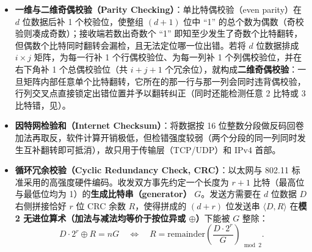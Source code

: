 \begin{itemize}
\item \textbf{一维与二维奇偶校验（Parity Checking）}：单比特偶校验（even parity）在 $d$ 位数据后补 1 个校验位，使整组 $(d+1)$ 位中 ``1'' 的总个数为偶数（奇校验则凑成奇数）；接收端若数出奇数个 ``1'' 即知至少发生了奇数个比特翻转，但偶数个比特同时翻转会漏检，且无法定位哪一位出错。若将 $d$ 位数据排成 $i \times j$ 矩阵，为每一行补 1 个行偶校验位、为每一列补 1 个列偶校验位，并在右下角补 1 个总偶校验位（共 $i+j+1$ 个冗余位），就构成\textbf{二维奇偶校验}：一旦矩阵内部任意单个比特翻转，它所在的那一行与那一列会同时违背偶校验，行列交叉点直接锁定出错位置并予以翻转纠正（同时还能检测任意 2 比特或 3 比特错，见）。
\item \textbf{因特网检验和（Internet Checksum）}：将数据按 16 位整数分段做反码回卷加法再取反，软件计算开销极低，但检错强度较弱（两个分段的同一列同时发生互补翻转即可抵消），故只用于传输层（TCP/UDP）和 IPv4 首部。
\item \textbf{循环冗余校验（Cyclic Redundancy Check, CRC）}：以太网与 802.11 标准采用的高强度硬件编码。收发双方事先约定一个长度为 $r + 1$ 比特（最高位与最低位均为 1）的\textbf{生成比特串（generator）} $G$。发送方需要在 $d$ 位数据 $D$ 右侧拼接恰好 $r$ 位 CRC 余数 $R$，使得拼成的 $(d + r)$ 位发送串 $\langle D, R\rangle$ 在\textbf{模 2 无进位算术（加法与减法均等价于按位异或 $\oplus$）}下能被 $G$ 整除：
\[
D \cdot 2^r \oplus R = n G \quad \Longleftrightarrow \quad R = \mathrm{remainder}\!\left(\frac{D \cdot 2^r}{G}\right)_{\bmod 2}.
\tag{6.1}
\]
\end{itemize}

